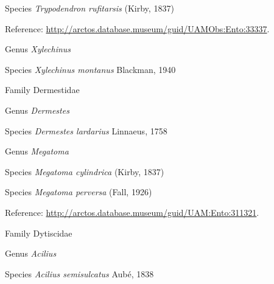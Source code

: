 \documentclass[9pt, article]{memoir}
\begin{document}
\begin{multicols}{2}
\vspace{6pt}\noindent\hspace{36pt}Species \textit{Trypodendron rufitarsis} (Kirby, 1837)


\vspace{6pt}Reference: 
\url{http://arctos.database.museum/guid/UAMObs:Ento:33337}.

\vspace{6pt}\noindent\hspace{30pt}Genus \textit{Xylechinus}


\vspace{6pt}\noindent\hspace{36pt}Species \textit{Xylechinus montanus} Blackman, 1940


\vspace{6pt}\noindent\hspace{24pt}Family Dermestidae


\vspace{6pt}\noindent\hspace{30pt}Genus \textit{Dermestes}


\vspace{6pt}\noindent\hspace{36pt}Species \textit{Dermestes lardarius} Linnaeus, 1758


\vspace{6pt}\noindent\hspace{30pt}Genus \textit{Megatoma}


\vspace{6pt}\noindent\hspace{36pt}Species \textit{Megatoma cylindrica} (Kirby, 1837)


\vspace{6pt}\noindent\hspace{36pt}Species \textit{Megatoma perversa} (Fall, 1926)


\vspace{6pt}Reference: 
\url{http://arctos.database.museum/guid/UAM:Ento:311321}.

\vspace{6pt}\noindent\hspace{24pt}Family Dytiscidae


\vspace{6pt}\noindent\hspace{30pt}Genus \textit{Acilius}


\vspace{6pt}\noindent\hspace{36pt}Species \textit{Acilius semisulcatus} Aubé, 1838



\end{multicols}
\end{document}
